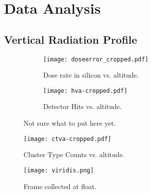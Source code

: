 \section{Data Analysis}
\label{Data Analysis}

\subsection{Vertical Radiation Profile}
\begin{figure}[H]
\centering
\begin{subfigure}{.5\textwidth}
  \centering
  \texttt{[image: doseerror\_cropped.pdf]}
  \caption{Dose rate in silicon vs. altitude.}
  \label{fig:sub1}
\end{subfigure}%
\begin{subfigure}{.5\textwidth}
  \centering
  \texttt{[image: hva-cropped.pdf]}
  \caption{Detector Hits vs. altitude.}
  \label{fig:sub2}
\end{subfigure}
\caption{Not sure what to put here yet.}
\label{fig:test}
\end{figure}

\begin{figure}[H]
\centering
\texttt{[image: ctva-cropped.pdf]}
\caption{Cluster Type Counts vs. altitude.}
\end{figure}

\begin{figure}[H]
\centering
\texttt{[image: viridis.png]}
\caption{Frame collected at float.}
\end{figure}
